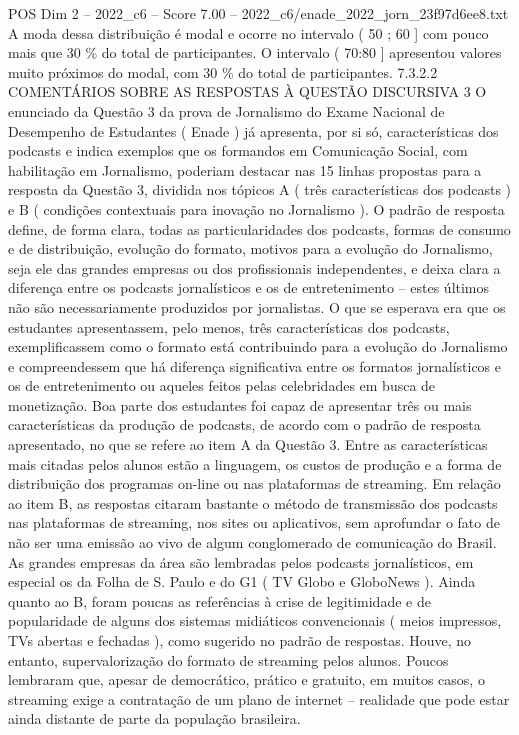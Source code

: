 \begin{textsample}{POS Dim 2 – 2022\_c6 – Score 7.00 – 2022\_c6/enade\_2022\_jorn\_23f97d6ee8.txt}
A moda dessa distribuição é modal e ocorre no intervalo ( 50 ; 60 ] com pouco mais que 30 \% do total de participantes.
O intervalo ( 70:80 ] apresentou valores muito próximos do modal, com 30 \% do total de participantes. 7.3.2.2 COMENTÁRIOS SOBRE AS RESPOSTAS À QUESTÃO DISCURSIVA 3 O enunciado da Questão 3 da prova de Jornalismo do Exame Nacional de Desempenho de Estudantes ( Enade ) já apresenta, por si só, características dos podcasts e indica exemplos que os formandos em Comunicação Social, com habilitação em Jornalismo, poderiam destacar nas 15 linhas propostas para a resposta da Questão 3, dividida nos tópicos A ( três características dos podcasts ) e B ( condições contextuais para inovação no Jornalismo ).
O padrão de resposta define, de forma clara, todas as particularidades dos podcasts, formas de consumo e de distribuição, evolução do formato, motivos para a evolução do Jornalismo, seja ele das grandes empresas ou dos profissionais independentes, e deixa clara a diferença entre os podcasts jornalísticos e os de entretenimento – estes últimos não são necessariamente produzidos por jornalistas.
O que se esperava era que os estudantes apresentassem, pelo menos, três características dos podcasts, exemplificassem como o formato está contribuindo para a evolução do Jornalismo e compreendessem que há diferença significativa entre os formatos jornalísticos e os de entretenimento ou aqueles feitos pelas celebridades em busca de monetização.
Boa parte dos estudantes foi capaz de apresentar três ou mais características da produção de podcasts, de acordo com o padrão de resposta apresentado, no que se refere ao item A da Questão 3.
Entre as características mais citadas pelos alunos estão a linguagem, os custos de produção e a forma de distribuição dos programas on-line ou nas plataformas de streaming.
Em relação ao item B, as respostas citaram bastante o método de transmissão dos podcasts nas plataformas de streaming, nos sites ou aplicativos, sem aprofundar o fato de não ser uma emissão ao vivo de algum conglomerado de comunicação do Brasil.
As grandes empresas da área são lembradas pelos podcasts jornalísticos, em especial os da Folha de S.
Paulo e do G1 ( TV Globo e GloboNews ).
Ainda quanto ao B, foram poucas as referências à crise de legitimidade e de popularidade de alguns dos sistemas midiáticos convencionais ( meios impressos, TVs abertas e fechadas ), como sugerido no padrão de respostas.
Houve, no entanto, supervalorização do formato de streaming pelos alunos.
Poucos lembraram que, apesar de democrático, prático e gratuito, em muitos casos, o streaming exige a contratação de um plano de internet – realidade que pode estar ainda distante de parte da população brasileira.

\end{textsample}
